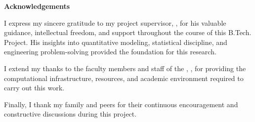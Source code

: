 \begin{flushright}
\huge{\textbf{Acknowledgements}}
\end{flushright}

I express my sincere gratitude to my project supervisor, \textbf{\supname}, for his valuable guidance, intellectual freedom, and support throughout the course of this B.Tech. Project. His insights into quantitative modeling, statistical discipline, and engineering problem-solving provided the foundation for this research.

I extend my thanks to the faculty members and staff of the \deptname{}, \univname{}, for providing the computational infrastructure, resources, and academic environment required to carry out this work.

Finally, I thank my family and peers for their continuous encouragement and constructive discussions during this project.

\vspace{1.5cm}
\begin{flushright}
\textbf{\authorname}\\
\rn\\
\deptname\\
\univname
\end{flushright}
\clearpage
